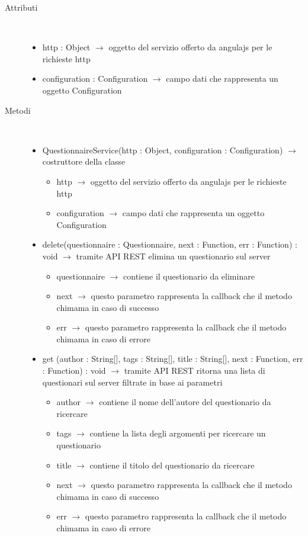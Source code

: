 \begin{description}
\item[Attributi] \hfill \\
\vspace{-7mm}
\begin{itemize}
	\item http : Object $\rightarrow$ oggetto del servizio offerto da angulajs per le richieste http
	\item configuration : Configuration $\rightarrow$ campo dati che rappresenta un oggetto Configuration
\end{itemize}

\item[Metodi] \hfill \\
\vspace{-7mm}
\begin{itemize}
	\item QuestionnaireService(http : Object, configuration : Configuration) $\rightarrow$ costruttore della classe\begin{itemize}
		\item http $\rightarrow$ oggetto del servizio offerto da angulajs per le richieste http
		\item configuration $\rightarrow$ campo dati che rappresenta un oggetto Configuration
	\end{itemize}
	
	\item delete(questionnaire : Questionnaire, next : Function, err : Function) : void $\rightarrow$ tramite API REST elimina un questionario sul server\begin{itemize}
		\item questionnaire $\rightarrow$ contiene il questionario da eliminare
		\item next $\rightarrow$ questo parametro rappresenta la callback che il metodo chimama in caso di successo
		\item err $\rightarrow$ questo parametro rappresenta la callback che il metodo chimama in caso di errore
	\end{itemize}
	
	\item get (author : String[], tags  : String[], title : String[], next : Function, err : Function) : void $\rightarrow$ tramite API REST ritorna una lista di questionari sul server filtrate in base ai parametri\begin{itemize}
		\item author $\rightarrow$ contiene il nome dell'autore del questionario da ricercare
		\item tags  $\rightarrow$ contiene la lista degli argomenti per ricercare un questionario
		\item title $\rightarrow$ contiene il titolo del questionario da ricercare
		\item next $\rightarrow$ questo parametro rappresenta la callback che il metodo chimama in caso di successo
		\item err $\rightarrow$ questo parametro rappresenta la callback che il metodo chimama in caso di errore
	\end{itemize}
	

\end{itemize}
\end{description}
